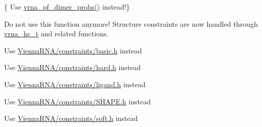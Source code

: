 \begin{DoxyRefList}
\item[Global \mbox{\hyperlink{group__part__func__global__deprecated_ga94c19120130e66a667a10a3c8598550c}{compute\+\_\+probabilities}} (double FAB, double FEA, double FEB, vrna\+\_\+ep\+\_\+t $\ast$pr\+AB, vrna\+\_\+ep\+\_\+t $\ast$prA, vrna\+\_\+ep\+\_\+t $\ast$prB, int Alength)]\label{deprecated__deprecated000116}%
%
\{ Use \mbox{\hyperlink{group__thermodynamics_gaa1e39e73afb51fbaf4ae38f0c066c46b}{vrna\+\_\+pf\+\_\+dimer\+\_\+probs()}} instead!\} 
\item[Global \mbox{\hyperlink{hard_8h_a36c3a6c3218b041f992052767bc74549}{constrain\+\_\+ptypes}} (const char $\ast$constraint, unsigned int length, char $\ast$ptype, int $\ast$\+BP, int min\+\_\+loop\+\_\+size, unsigned int idx\+\_\+type)]\label{deprecated__deprecated000163}%
%
Do not use this function anymore! Structure constraints are now handled through \mbox{\hyperlink{group__hard__constraints_gac7e4c4f8abe3163a68110c5bff24e01d}{vrna\+\_\+hc\+\_\+t}} and related functions. 
\item[File \mbox{\hyperlink{constraints_8h}{constraints.h}} ]\label{deprecated__deprecated000039}%
%
Use \mbox{\hyperlink{constraints_2basic_8h}{Vienna\+RNA/constraints/basic.\+h}} instead  
\item[File \mbox{\hyperlink{constraints__hard_8h}{constraints\+\_\+hard.h}} ]\label{deprecated__deprecated000040}%
%
Use \mbox{\hyperlink{hard_8h}{Vienna\+RNA/constraints/hard.\+h}} instead  
\item[File \mbox{\hyperlink{constraints__ligand_8h}{constraints\+\_\+ligand.h}} ]\label{deprecated__deprecated000041}%
%
Use \mbox{\hyperlink{ligand_8h}{Vienna\+RNA/constraints/ligand.\+h}} instead  
\item[File \mbox{\hyperlink{constraints__SHAPE_8h}{constraints\+\_\+\+SHAPE.h}} ]\label{deprecated__deprecated000042}%
%
Use \mbox{\hyperlink{SHAPE_8h}{Vienna\+RNA/constraints/\+SHAPE.\+h}} instead  
\item[File \mbox{\hyperlink{constraints__soft_8h}{constraints\+\_\+soft.h}} ]\label{deprecated__deprecated000043}%
%
Use \mbox{\hyperlink{soft_8h}{Vienna\+RNA/constraints/soft.\+h}} instead  
\item[File \mbox{\hyperlink{convert__epars_8h}{convert\+\_\+epars.h}} ]\label{deprecated__deprecated000044}%

\end{DoxyRefList}

